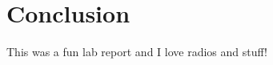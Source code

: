 \documentclass[11pt]{article}
\begin{document}


\section{Conclusion}
This was a fun lab report and I love radios and stuff! %

\end{document}
